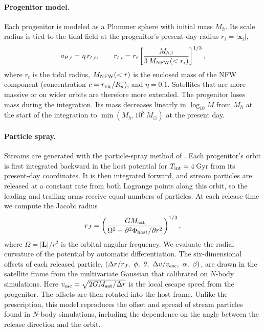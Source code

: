 \paragraph{Progenitor model.}
Each progenitor is modeled as a Plummer sphere with initial mass $M_h$. Its scale radius is
tied to the tidal field at the progenitor's present-day radius $r_i = |\mathbf{x}_i|$,
\begin{equation}
    a_{{\rm P},i} = \eta\, r_{t,i}, \qquad
    r_{t,i} = r_i \left[\frac{M_{h,i}}{3\,M_{\rm NFW}(<r_i)}\right]^{1/3},
    \label{eq:plummer}
\end{equation}
where $r_t$ is the \citet{King1962} tidal radius, $M_{\rm NFW}(<r)$ is the enclosed mass of
the NFW component (concentration $c = r_{\rm vir}/R_s$), and $\eta = 0.1$. Satellites that
are more massive or on wider orbits are therefore more extended. The progenitor loses mass
during the integration. Its mass decreases linearly in $\log_{10} M$ from $M_h$ at the start
of the integration to $\min(M_h, 10^{8}\,M_\odot)$ at the present day.

\paragraph{Particle spray.}
Streams are generated with the particle-spray method of \citet{Chen2025}. Each progenitor's
orbit is first integrated backward in the host potential for $T_{\rm int} = 4$\,Gyr from its
present-day coordinates. It is then integrated forward, and stream particles are released at
a constant rate from both Lagrange points along this orbit, so the leading and trailing arms
receive equal numbers of particles. At each release time we compute the Jacobi radius
\begin{equation}
    r_J = \left(\frac{G M_{\rm sat}}{\Omega^2 - \partial^2\Phi_{\rm host}/\partial r^2}\right)^{1/3},
\end{equation}
where $\Omega = |\mathbf{L}|/r^2$ is the orbital angular frequency. We evaluate the radial
curvature of the potential by automatic differentiation. The six-dimensional offsets of each
released particle, $(\Delta r/r_J,\ \phi,\ \theta,\ \Delta v/v_{\rm esc},\ \alpha,\ \beta)$,
are drawn in the satellite frame from the multivariate Gaussian that \citet{Chen2025}
calibrated on $N$-body simulations. Here $v_{\rm esc} = \sqrt{2 G M_{\rm sat}/\Delta r}$ is
the local escape speed from the progenitor. The offsets are then rotated into the host frame.
Unlike the \citet{Fardal2015} prescription, this model reproduces the offset and spread of
stream particles found in $N$-body simulations, including the dependence on the angle
between the release direction and the orbit.

